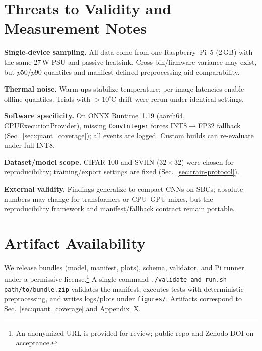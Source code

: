 \documentclass{article}
\begin{document}
\section{Threats to Validity and Measurement Notes}
\label{sec:threats}

\textbf{Single-device sampling.}
All data come from one Raspberry~Pi~5 (2\,GB) with the same 27\,W PSU and passive heatsink.  
Cross-bin/firmware variance may exist, but $p50$/$p90$ quantiles and manifest-defined preprocessing aid comparability.

\textbf{Thermal noise.}
Warm-ups stabilize temperature; per-image latencies enable offline quantiles.  
Trials with $>10^{\circ}$C drift were rerun under identical settings.

\textbf{Software specificity.}
On ONNX Runtime~1.19 (aarch64, CPUExecutionProvider), missing \texttt{ConvInteger} forces INT8$\to$FP32 fallback (Sec.~\ref{sec:quant_coverage}); all events are logged.  
Custom builds can re-evaluate under full INT8.

\textbf{Dataset/model scope.}
CIFAR-100 and SVHN ($32{\times}32$) were chosen for reproducibility; training/export settings are fixed (Sec.~\ref{sec:train-protocol}).

\textbf{External validity.}
Findings generalize to compact CNNs on SBCs; absolute numbers may change for transformers or CPU–GPU mixes, but the reproducibility framework and manifest/fallback contract remain portable.

\section{Artifact Availability}
\label{sec:artifact-availability}

We release bundles (model, manifest, plots), schema, validator, and Pi runner under a permissive license.\footnote{An anonymized URL is provided for review; public repo and Zenodo DOI on acceptance.}
A single command
\verb|./validate_and_run.sh path/to/bundle.zip|
validates the manifest, executes tests with deterministic preprocessing, and writes logs/plots under \texttt{figures/}.  
Artifacts correspond to Sec.~\ref{sec:quant_coverage} and Appendix~X.
\end{document}
